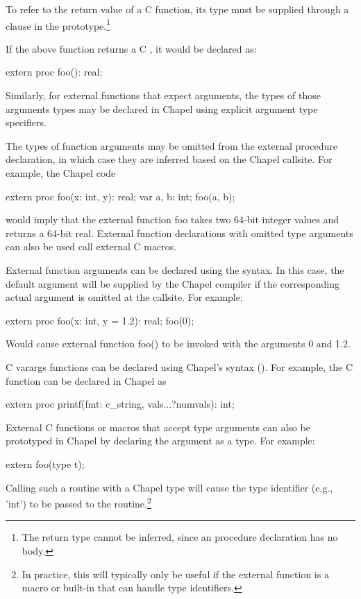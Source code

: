 To refer to the return value of a C function, its type must be supplied through
a  clause in the prototype.\footnote{The return type cannot be
inferred, since an  procedure declaration has no body.}

If the above function returns a C , it would be declared as:
\begin{chapel}
       extern proc foo(): real;
\end{chapel}
Similarly, for external functions that expect arguments, the types of those
arguments types may be declared in Chapel using explicit argument type specifiers.

The types of function arguments may be omitted from the external procedure
declaration, in which case they are inferred based on the Chapel callsite.
For example, the Chapel code
\begin{chapel}
       extern proc foo(x: int, y): real;
       var a, b: int;
       foo(a, b);
\end{chapel}
\noindent
would imply that the external function foo takes two 64-bit integer values
and returns a 64-bit real.  External function declarations with omitted type
arguments can also be used call external C macros.

External function arguments can be declared using the 
syntax.  In this case, the default argument will be supplied by the Chapel
compiler if the corresponding actual argument is omitted at the callsite.  For example:
\begin{chapel}
       extern proc foo(x: int, y = 1.2): real;
       foo(0);
\end{chapel}
Would cause external function foo() to be invoked with the arguments 0
and 1.2.

C varargs functions can be declared using
Chapel's  syntax ().  For example,
the C  function can be declared in Chapel as
\begin{chapel}
       extern proc printf(fmt: c_string, vals...?numvals): int;
\end{chapel}

External C functions or macros that accept type arguments can also be
prototyped in Chapel by declaring the argument as a type.  For
example:
\begin{chapel}
       extern foo(type t);
\end{chapel}
Calling such a routine with a Chapel type will cause the type
identifier (e.g., 'int') to be passed to the routine.\footnote{In practice,
this will typically only be useful if the external function is a macro
or built-in that can handle type identifiers.}

